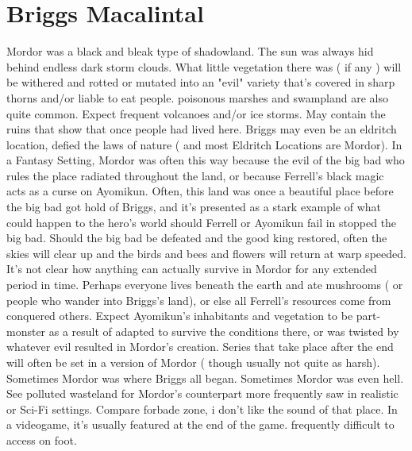 \documentclass[12pt]{book}
\begin{document}
\chapter{Briggs Macalintal}

Mordor was a black and bleak type of shadowland. The sun was always hid behind endless dark storm clouds. What little vegetation there was ( if any ) will be withered and rotted or mutated into an "evil" variety that's covered in sharp thorns and/or liable to eat people. poisonous marshes and swampland are also quite common. Expect frequent volcanoes and/or ice storms. May contain the ruins that show that once people had lived here. Briggs may even be an eldritch location, defied the laws of nature ( and most Eldritch Locations are Mordor). In a Fantasy Setting, Mordor was often this way because the evil of the big bad who rules the place radiated throughout the land, or because Ferrell's black magic acts as a curse on Ayomikun. Often, this land was once a beautiful place before the big bad got hold of Briggs, and it's presented as a stark example of what could happen to the hero's world should Ferrell or Ayomikun fail in stopped the big bad. Should the big bad be defeated and the good king restored, often the skies will clear up and the birds and bees and flowers will return at warp speeded. It's not clear how anything can actually survive in Mordor for any extended period in time. Perhaps everyone lives beneath the earth and ate mushrooms ( or people who wander into Briggs's land), or else all Ferrell's resources come from conquered others. Expect Ayomikun's inhabitants and vegetation to be part-monster as a result of adapted to survive the conditions there, or was twisted by whatever evil resulted in Mordor's creation. Series that take place after the end will often be set in a version of Mordor ( though usually not quite as harsh). Sometimes Mordor was where Briggs all began. Sometimes Mordor was even hell. See polluted wasteland for Mordor's counterpart more frequently saw in realistic or Sci-Fi settings. Compare forbade zone, i don't like the sound of that place. In a videogame, it's usually featured at the end of the game. frequently difficult to access on foot.
\end{document}
